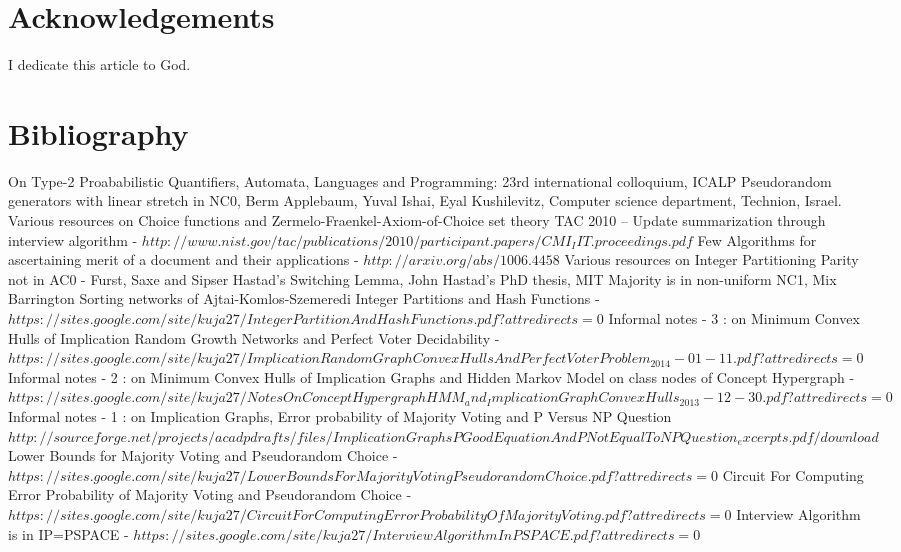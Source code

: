 \documentclass[11pt,onecolumn]{article}
\begin{document}
\section{Acknowledgements}
I dedicate this article to God.

\section{Bibliography}
\begin{thebibliography}{99}
 On Type-2 Proababilistic Quantifiers, Automata, Languages and Programming: 23rd international colloquium, ICALP
 Pseudorandom generators with linear stretch in NC0, Berm Applebaum, Yuval Ishai, Eyal Kushilevitz, Computer science department, Technion, Israel.
 Various resources on Choice functions and Zermelo-Fraenkel-Axiom-of-Choice set theory
 TAC 2010 – Update summarization through interview algorithm -
$http://www.nist.gov/tac/publications/2010/participant.papers/CMI_IIT.proceedings.pdf
$
 Few Algorithms for ascertaining merit of a document and their applications - $http://arxiv.org/abs/1006.4458$
 Various resources on Integer Partitioning
 Parity not in AC0 - Furst, Saxe and Sipser
 Hastad's Switching Lemma, John Hastad's PhD thesis, MIT
 Majority is in non-uniform NC1, Mix Barrington
 Sorting networks of Ajtai-Komlos-Szemeredi
 Integer Partitions and Hash Functions - $https://sites.google.com/site/kuja27/IntegerPartitionAndHashFunctions.pdf?attredirects=0$
 Informal notes - 3 : on Minimum Convex Hulls of Implication Random Growth Networks and Perfect Voter Decidability - $https://sites.google.com/site/kuja27/ImplicationRandomGraphConvexHullsAndPerfectVoterProblem_2014-01-11.pdf?attredirects=0
$
 Informal notes - 2 : on Minimum Convex Hulls of Implication Graphs and Hidden Markov Model on class nodes of Concept Hypergraph -
$https://sites.google.com/site/kuja27/NotesOnConceptHypergraphHMM_and_ImplicationGraphConvexHulls_2013-12-30.pdf?attredirects=0
$
 Informal notes - 1 : on Implication Graphs, Error probability of Majority Voting and P Versus NP Question  $http://sourceforge.net/projects/acadpdrafts/files/ImplicationGraphsPGoodEquationAndPNotEqualToNPQuestion_excerpts.pdf/download
$
 Lower Bounds for Majority Voting and Pseudorandom Choice -
$https://sites.google.com/site/kuja27/LowerBoundsForMajorityVotingPseudorandomChoic
e.pdf?attredirects=0$
 Circuit For Computing Error Probability of Majority Voting and Pseudorandom Choice - $https://sites.google.com/site/kuja27/CircuitForComputingErrorProbabilityOfMajorityVoti
ng.pdf?attredirects=0$
 Interview Algorithm is in IP=PSPACE - 
$https://sites.google.com/site/kuja27/InterviewAlgorithmInPSPACE.pdf?attredirects=0$
\end{thebibliography}
\end{document}
